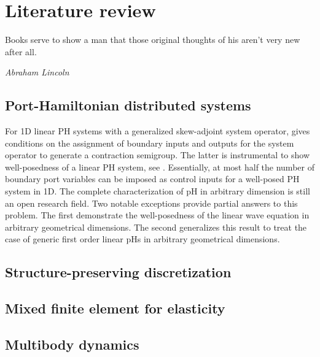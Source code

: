\chapter[Literature review]{Literature review}

\epigraph{Books serve to show a man that those original thoughts of his aren't very new after all.}{\textit{Abraham Lincoln}}



\section{Port-Hamiltonian distributed systems}

 For 1D linear PH systems with a generalized skew-adjoint system operator, \cite{legorrec2005} gives conditions on the assignment of boundary inputs and outputs for the system operator to generate a contraction semigroup. The latter is instrumental to show well-posedness of a linear PH
system, see \cite{zwart2012}. Essentially, at most half the number of boundary port variables
can be imposed as control inputs for a well-posed PH system in 1D. The complete characterization of pH in arbitrary dimension is still an open research field. Two notable exceptions \cite{zwart2015wave,skrepek2019wellposedness} provide partial answers to this problem. The first demonstrate the well-posedness of the linear wave equation in arbitrary geometrical dimensions. The second generalizes this result to treat the case of generic first order linear pHs in arbitrary geometrical dimensions. \\


\section{Structure-preserving discretization}

\section{Mixed finite element for elasticity}

\section{Multibody dynamics}